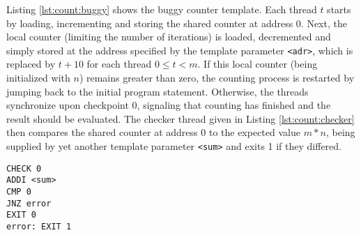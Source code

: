Listing \ref{lst:count:buggy} shows the buggy counter template. %
Each thread $t$ starts by loading, incrementing and storing the shared counter at address 0.
Next, the local counter (limiting the number of iterations) is loaded, decremented and simply stored at the address specified by the template parameter \texttt{<adr>}, which is replaced by $t + 10$ for each thread $0 \leq t < m$.
If this local counter (being initialized with $n$) remains greater than zero, the counting process is restarted by jumping back to the initial program statement.
Otherwise, the threads synchronize upon checkpoint 0, signaling that counting has finished and the result should be evaluated.
The checker thread given in Listing \ref{lst:count:checker} then compares the shared counter at address 0 to the expected value $m * n$, being supplied by yet another template parameter \texttt{<sum>} and exits 1 if they differed.
\begin{lstlisting}[style=asm, caption={Checker template.}, label={lst:count:checker}, mathescape, xleftmargin=0.39\textwidth]
CHECK 0
ADDI <sum>
CMP 0
JNZ error
EXIT 0
error: EXIT 1
\end{lstlisting}

